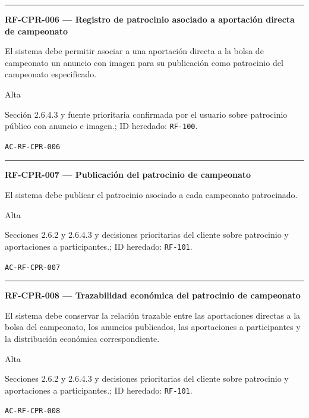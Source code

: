 \documentclass[10pt,letterpaper]{article}
\begin{document}
\vspace{0.25em}\hrule\vspace{0.65em}
\noindent\textbf{RF-CPR-006 --- Registro de patrocinio asociado a aportación directa de campeonato}\par
\begin{description}[style=nextline,leftmargin=3.15cm,labelwidth=2.8cm,font=\normalfont\bfseries]
\item[Obligación] El sistema debe permitir asociar a una aportación directa a la bolsa de campeonato un anuncio con imagen para su publicación como patrocinio del campeonato especificado.
\item[Prioridad] Alta
\item[Procedencia] Sección 2.6.4.3 y fuente prioritaria confirmada por el usuario sobre patrocinio público con anuncio e imagen.; ID heredado: \texttt{RF-100}.
\item[Verificación] \texttt{AC-RF-CPR-006}
\end{description}
\vspace{0.25em}\hrule\vspace{0.65em}
\noindent\textbf{RF-CPR-007 --- Publicación del patrocinio de campeonato}\par
\begin{description}[style=nextline,leftmargin=3.15cm,labelwidth=2.8cm,font=\normalfont\bfseries]
\item[Obligación] El sistema debe publicar el patrocinio asociado a cada campeonato patrocinado.
\item[Prioridad] Alta
\item[Procedencia] Secciones 2.6.2 y 2.6.4.3 y decisiones prioritarias del cliente sobre patrocinio y aportaciones a participantes.; ID heredado: \texttt{RF-101}.
\item[Verificación] \texttt{AC-RF-CPR-007}
\end{description}
\vspace{0.25em}\hrule\vspace{0.65em}
\noindent\textbf{RF-CPR-008 --- Trazabilidad económica del patrocinio de campeonato}\par
\begin{description}[style=nextline,leftmargin=3.15cm,labelwidth=2.8cm,font=\normalfont\bfseries]
\item[Obligación] El sistema debe conservar la relación trazable entre las aportaciones directas a la bolsa del campeonato, los anuncios publicados, las aportaciones a participantes y la distribución económica correspondiente.
\item[Prioridad] Alta
\item[Procedencia] Secciones 2.6.2 y 2.6.4.3 y decisiones prioritarias del cliente sobre patrocinio y aportaciones a participantes.; ID heredado: \texttt{RF-101}.
\item[Verificación] \texttt{AC-RF-CPR-008}
\end{description}
\end{document}
